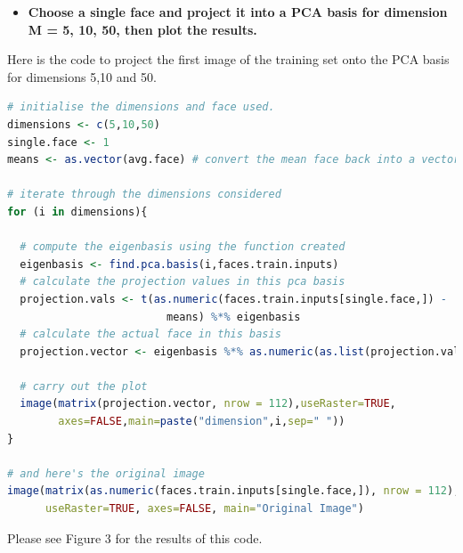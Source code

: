 \documentclass[12pt]{article}
\begin{document}
\begin{itemize}
\item \textbf{Choose a single face and project it into a PCA basis for dimension M = 5, 10, 50, then plot the results.}
\end{itemize}

Here is the code to project the first image of the training set onto the PCA basis for dimensions 5,10 and 50.
\newpage 
\begin{lstlisting}[linewidth=18.4cm,language=R]
# initialise the dimensions and face used.
dimensions <- c(5,10,50)
single.face <- 1
means <- as.vector(avg.face) # convert the mean face back into a vector

# iterate through the dimensions considered
for (i in dimensions){
  
  # compute the eigenbasis using the function created
  eigenbasis <- find.pca.basis(i,faces.train.inputs)
  # calculate the projection values in this pca basis
  projection.vals <- t(as.numeric(faces.train.inputs[single.face,]) - 
                         means) %*% eigenbasis
  # calculate the actual face in this basis
  projection.vector <- eigenbasis %*% as.numeric(as.list(projection.vals))
  
  # carry out the plot
  image(matrix(projection.vector, nrow = 112),useRaster=TRUE, 
        axes=FALSE,main=paste("dimension",i,sep=" "))
}

# and here's the original image
image(matrix(as.numeric(faces.train.inputs[single.face,]), nrow = 112), 
      useRaster=TRUE, axes=FALSE, main="Original Image")
\end{lstlisting}
Please see Figure 3 for the results of this code.
\end{document}
